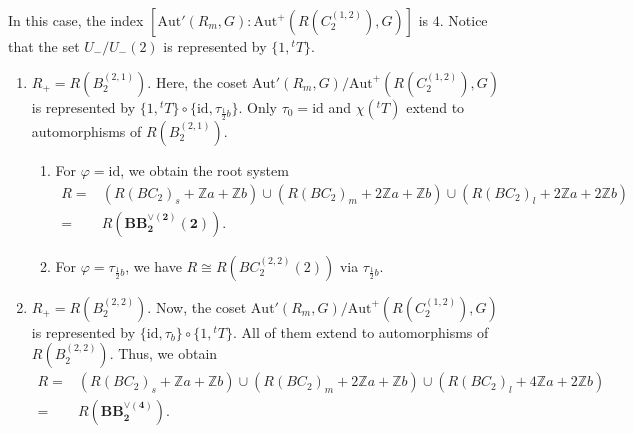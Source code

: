 \documentclass[11pt]{amsart}
\newcommand{\Z}{\mathbb{Z}}
\newcommand{\Aut}{\mathrm{Aut}}
\newcommand{\id}{\mathrm{id}}
\begin{document}
In this case, the index $[\Aut'(R_m,G):\Aut^+(R(C_2^{(1,2)}),G)]$ is $4$.  
Notice that the set $U_-/U_-(2)$ is represented by $\{ 1,{}^tT \}$.
\begin{enumerate}
\item[(I)] $R_+=R(B_2^{(2,1)})$. Here, the coset $\Aut'(R_m,G)/\Aut^+(R(C_2^{(1,2)}),G)$ is represented by $\{1, {}^tT\} \circ \{ \id, \tau_{\frac{1}{2}b}\}$.
Only $\tau_0=\id$ and $\chi({}^tT)$ extend to automorphisms of $R(B_2^{(2,1)})$. 
\begin{enumerate} 
\item[(i)] For $\varphi=\id$, we obtain the root system 
\begin{align*}
R=&(R(BC_2)_s+\Z a+\Z b) \cup (R(BC_2)_m+2\Z a+\Z b) \cup (R(BC_2)_l+2\Z a+2\Z b)\\
=&R(\mathbf{BB_2^{\vee(2)}(2)}).
\end{align*}
\item[(ii)] For $\varphi=\tau_{\frac{1}{2}b}$, we have  $R \cong R(BC_2^{(2,2)}(2))$ via $\tau_{\frac{1}{2}b}$. 
\end{enumerate}
\item[(II)] $R_+=R(B_2^{(2,2)})$. Now, the coset $\Aut'(R_m,G)/\Aut^+(R(C_2^{(1,2)}),G)$ is represented by $\{ \id, \tau_{b}\} \circ \{1,{}^tT\}$. 
All of them extend to automorphisms of $R(B_2^{(2,2)})$. Thus, we obtain
\begin{align*}
R=&(R(BC_2)_s+\Z a+\Z b) \cup (R(BC_2)_m+2\Z a+\Z b) \cup (R(BC_2)_l+4\Z a+2\Z b)\\
=&R(\mathbf{BB_2^{\vee(4)}}).
\end{align*}
\end{enumerate}


\end{document}
